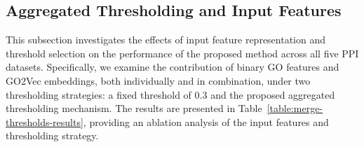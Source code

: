 \begin{table}[t]
	\centering
	\caption{Performance of different activation functions using GO2Vec features across three PPI datasets}
	\label{table:activation_go2vec}
	\footnotesize
	\vspace{2mm}
\end{table}


\subsection{Aggregated Thresholding and Input Features}

This subsection investigates the effects of input feature representation and threshold selection on the performance of the proposed method across all five PPI datasets. Specifically, we examine the contribution of binary GO features and GO2Vec embeddings, both individually and in combination, under two thresholding strategies: a fixed threshold of $0.3$ and the proposed aggregated thresholding mechanism. The results are presented in Table~\ref{table:merge-thresholds-results}, providing an ablation analysis of the input features and thresholding strategy.

